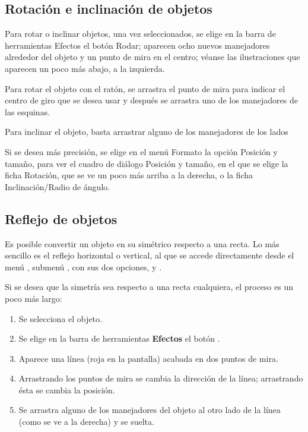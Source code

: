 \subsection{Rotación e inclinación de objetos}

Para rotar o inclinar objetos, una vez seleccionados, se elige en la
barra de herramientas Efectos el botón Rodar; aparecen ocho nuevos
manejadores alrededor del objeto y un punto de mira en el centro;
véanse las ilustraciones que aparecen un poco más abajo, a la
izquierda.

Para rotar el objeto con el ratón, se arrastra el punto de mira para
indicar el centro de giro que se desea usar y después se arrastra uno
de los manejadores de las esquinas.

Para inclinar el objeto, basta arrastrar alguno de los manejadores de
los lados
 
Si se desea más precisión, se elige en el menú Formato la opción
Posición y tamaño, para ver el cuadro de diálogo Posición y tamaño, en
el que se elige la ficha Rotación, que se ve un poco más arriba a la
derecha, o la ficha Inclinación/Radio de ángulo.

\subsection{Reflejo de objetos}

Es posible convertir un objeto en su simétrico respecto a una
recta. Lo más sencillo es el reflejo horizontal o vertical, al que se
accede directamente desde el menú , submenú
, con sus dos opciones,  y
.

Si se desea que la simetría sea respecto a una recta cualquiera, el
proceso es un poco más largo:

\begin{enumerate}
\item Se selecciona el objeto.

\item Se elige en la barra de herramientas \textbf{Efectos} el botón 
.

\item Aparece una línea (roja en la pantalla) acabada en dos puntos 
de mira.

\item Arrastrando los puntos de mira se cambia la dirección de la 
línea; arrastrando ésta se cambia la posición.

\item Se arrastra alguno de los manejadores del objeto al otro lado 
de la línea (como se ve a la derecha) y se suelta.
\end{enumerate}

